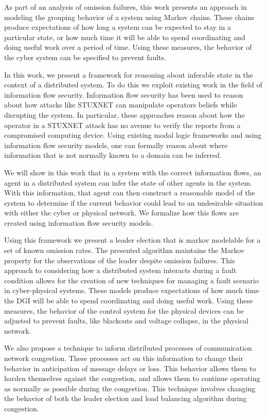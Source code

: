 As part of an analysis of omission failures, this work presents an approach in modeling the grouping behavior of a system using Markov chains.
These chains produce expectations of how long a system can be expected to stay in a particular state, or how much time it will be able to spend coordinating and doing useful work over a period of time.
Using these measures, the behavior of the cyber system can be specified to prevent faults.

In this work, we present a framework for reasoning about inferable state in the context of a distributed system. To do this we exploit existing work in the field of information flow security. Information flow security has been used to reason about how attacks like STUXNET can manipulate operators beliefs while disrupting the system\cite{STUXNET}. In particular, these approaches reason about how the operator in a STUXNET attack has no avenue to verify the reports from a compromised computing device. Using existing modal logic frameworks and using information flow security models\cite{Howser2012}\cite{STUXNET}\cite{Howser2013}, one can formally reason about where information that is not normally known to a domain can be inferred.

We will show in this work that in a system with the correct information flows, an agent in a distributed system can infer the state of other agents in the system. With this information, that agent can then construct a reasonable model of the system to determine if the current behavior could lead to an undesirable situation with either the cyber or physical network. We formalize how this flows are created using information flow security models.

Using this framework we present a leader election that is markov modelable for a set of known omission rates.
The presented algorithm maintains the Markov property for the observations of the leader despite omission\cite{OMISSIONFAILURES} failures.
This approach to considering how a distributed system interacts during a fault condition allows for the creation of new techniques for managing a fault scenario in cyber-physical systems.
These models produce expectations of how much time the DGI will be able to spend coordinating and doing useful work.
Using these measures, the behavior of the control system for the physical devices can be adjusted to prevent faults, like blackouts and voltage collapse, in the physical network.

We also propose a technique to inform distributed processes of communication network congestion.
These processes act on this information to change their behavior in anticipation of message delays or loss.
This behavior allows them to harden themselves against the congestion, and allows them to continue operating as normally as possible during the congestion.
This technique involves changing the behavior of both the leader election\cite{INVITATIONELECTION} and load balancing algorithm during congestion.

